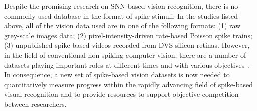 Despite the promising research on SNN-based vision recognition, there is no commonly used database in the format of spike stimuli.
In the studies listed above, all of the vision data used are in one of the following formats:
(1) raw grey-scale images data;
(2) pixel-intensity-driven rate-based Poisson spike trains;
(3) unpublished spike-based videos recorded from DVS silicon retinas.
However, in the field of conventional non-spiking computer vision, there are a number of datasets playing important roles at different times and with various objectives~\citep{lecun1998gradient,deng2009imagenet,blank2005actions,liu2009recognizing}.
In consequence, a new set of spike-based vision datasets is now needed to quantitatively measure progress within the rapidly advancing field of spike-based visual recognition and to provide resources to support objective competition between researchers.

